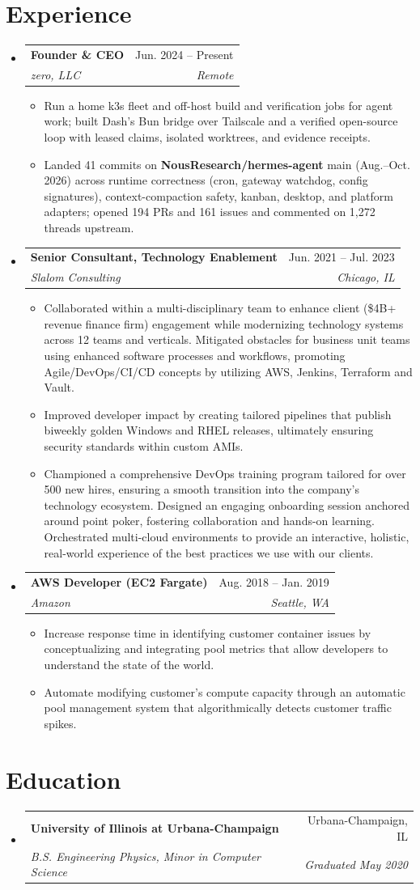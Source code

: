 \documentclass[letterpaper,11pt]{article}
\makeatletter
\newcommand{\resumeItem}[1]{\item\small{#1 \vspace{-2pt}}}
\newcommand{\resumeSubheading}[4]{%
  \vspace{-2pt}\item
    \begin{tabular*}{0.97\textwidth}[t]{l@{\extracolsep{\fill}}r}
      \textbf{#1} & #2 \\
      \textit{\small#3} & \textit{\small #4} \\
    \end{tabular*}\vspace{-7pt}
}
\newcommand{\resumeSubHeadingListStart}{\begin{itemize}[leftmargin=0.15in, label={}]}
\newcommand{\resumeSubHeadingListEnd}{\end{itemize}}
\newcommand{\resumeItemListStart}{\begin{itemize}}
\newcommand{\resumeItemListEnd}{\end{itemize}\vspace{-5pt}}
\makeatother
\begin{document}
\section{Experience}
  \resumeSubHeadingListStart
    \resumeSubheading
      {Founder \& CEO}{Jun. 2024 -- Present}
      {zero, LLC}{Remote}
      \resumeItemListStart
        \resumeItem{Run a home k3s fleet and off-host build and verification jobs for agent work; built Dash's Bun bridge over Tailscale and a verified open-source loop with leased claims, isolated worktrees, and evidence receipts.}
        \resumeItem{Landed 41 commits on \textbf{NousResearch/hermes-agent} main (Aug.--Oct. 2026) across runtime correctness (cron, gateway watchdog, config signatures), context-compaction safety, kanban, desktop, and platform adapters; opened 194 PRs and 161 issues and commented on 1,272 threads upstream.}
      \resumeItemListEnd
    \resumeSubheading
      {Senior Consultant, Technology Enablement}{Jun. 2021 -- Jul. 2023}
      {Slalom Consulting}{Chicago, IL}
      \resumeItemListStart
        \resumeItem{Collaborated within a multi-disciplinary team to enhance client (\$4B+ revenue finance firm) engagement while modernizing technology systems across 12 teams and verticals. Mitigated obstacles for business unit teams using enhanced software processes and workflows, promoting Agile/DevOps/CI/CD concepts by utilizing AWS, Jenkins, Terraform and Vault.}
        \resumeItem{Improved developer impact by creating tailored pipelines that publish biweekly golden Windows and RHEL releases, ultimately ensuring security standards within custom AMIs.}
        \resumeItem{Championed a comprehensive DevOps training program tailored for over 500 new hires, ensuring a smooth transition into the company's technology ecosystem. Designed an engaging onboarding session anchored around point poker, fostering collaboration and hands-on learning. Orchestrated multi-cloud environments to provide an interactive, holistic, real-world experience of the best practices we use with our clients.}
      \resumeItemListEnd
    \resumeSubheading
      {AWS Developer (EC2 Fargate)}{Aug. 2018 -- Jan. 2019}
      {Amazon}{Seattle, WA}
      \resumeItemListStart
        \resumeItem{Increase response time in identifying customer container issues by conceptualizing and integrating pool metrics that allow developers to understand the state of the world.}
        \resumeItem{Automate modifying customer's compute capacity through an automatic pool management system that algorithmically detects customer traffic spikes.}
      \resumeItemListEnd
  \resumeSubHeadingListEnd

\section{Education}
  \resumeSubHeadingListStart
    \resumeSubheading
      {University of Illinois at Urbana-Champaign}{Urbana-Champaign, IL}
      {B.S. Engineering Physics, Minor in Computer Science}{Graduated May 2020}
  \resumeSubHeadingListEnd
\end{document}
